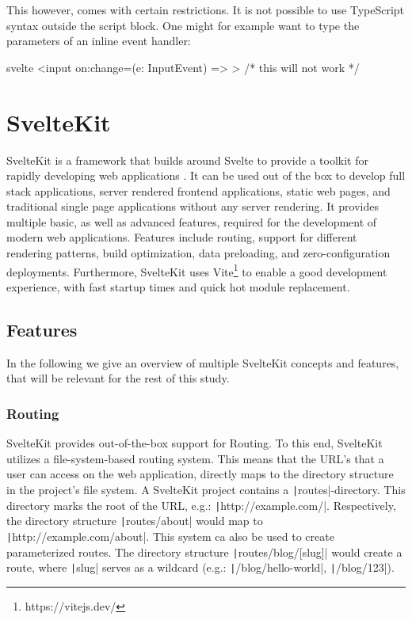 This however, comes with certain restrictions. It is not possible to use TypeScript syntax outside the script block. One might for example want to type the parameters of an inline event handler:

\begin{myminted}{svelte}{}
<input on:change={(e: InputEvent) => {}}> /* this will not work */
\end{myminted}



\section{SvelteKit}
\label{sec:sveltekit}

SvelteKit is a framework that builds around Svelte to provide a toolkit for rapidly developing web applications \cite{noauthor_sveltekit_nodate}. It can be used out of the box to develop full stack applications, server rendered frontend applications, static web pages, and traditional single page applications without any server rendering. It provides multiple basic, as well as advanced features, required for the development of modern web applications. Features include routing, support for different rendering patterns, build optimization, data preloading, and zero-configuration deployments. Furthermore, SvelteKit uses Vite\footnote{https://vitejs.dev/} to enable a good development experience, with fast startup times and quick hot module replacement.


\subsection{Features}
In the following we give an overview of multiple SvelteKit concepts and features, that will be relevant for the rest of this study.


\subsubsection{Routing}
\label{sec:sveltekit-routing}

SvelteKit provides out-of-the-box support for Routing. To this end, SvelteKit utilizes a file-system-based routing system. This means that the URL's that a user can access on the web application, directly maps to the directory structure in the project's file system. A SvelteKit project contains a \texttt|routes|-directory. This directory marks the root of the URL, e.g.: \texttt|http://example.com/|. Respectively, the directory structure \texttt|routes/about| would map to \texttt|http://example.com/about|. This system ca also be used to create parameterized routes. The directory structure \texttt|routes/blog/[slug]| would create a route, where \texttt|slug| serves as a wildcard (e.g.: \texttt|/blog/hello-world|, \texttt|/blog/123|).

